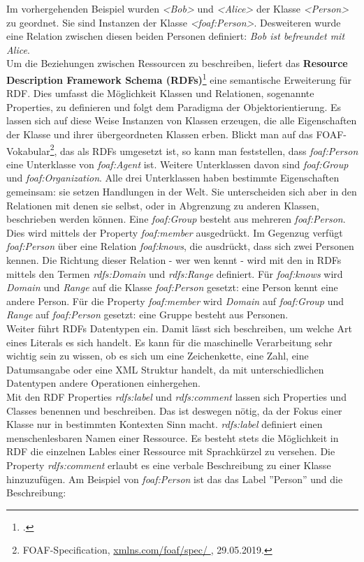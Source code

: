 \documentclass[12pt,a4paper]{article}
\begin{document}
Im vorhergehenden Beispiel wurden \textit{<Bob>} und \textit{<Alice>} der Klasse \textit{<Person>} zu geordnet. Sie sind Instanzen der Klasse \textit{<foaf:Person>}. Desweiteren wurde eine Relation zwischen diesen beiden Personen definiert: \textit{Bob ist befreundet mit Alice}.
\\
Um die Beziehungen zwischen Ressourcen zu beschreiben, liefert das \textbf{Resource Description Framework Schema (RDFs)}\footcite[][]{brickley2014rdf} eine semantische Erweiterung für RDF. Dies umfasst die Möglichkeit Klassen und Relationen, sogenannte Properties, zu definieren und folgt dem Paradigma der Objektorientierung. Es lassen sich auf diese Weise Instanzen von Klassen erzeugen, die alle Eigenschaften der Klasse und ihrer übergeordneten Klassen erben. Blickt man auf das FOAF-Vokabular\footnote{FOAF-Specification, \protect\url{xmlns.com/foaf/spec/ }, 29.05.2019.}, das als RDFs umgesetzt ist, so kann man feststellen, dass \textit{foaf:Person} eine Unterklasse von \textit{foaf:Agent} ist. Weitere Unterklassen davon sind \textit{foaf:Group} und \textit{foaf:Organization}. Alle drei Unterklassen haben bestimmte Eigenschaften gemeinsam: sie setzen Handlungen in der Welt. Sie unterscheiden sich aber in den Relationen mit denen sie selbst, oder in Abgrenzung zu anderen Klassen, beschrieben werden können. Eine \textit{foaf:Group} besteht aus mehreren \textit{foaf:Person}. Dies wird mittels der Property \textit{foaf:member} ausgedrückt. Im Gegenzug verfügt \textit{foaf:Person} über eine Relation \textit{foaf:knows}, die ausdrückt, dass sich zwei Personen kennen. Die Richtung dieser Relation - wer wen kennt - wird mit den in RDFs mittels den Termen \textit{rdfs:Domain} und \textit{rdfs:Range} definiert. 
Für \textit{foaf:knows} wird \textit{Domain} und \textit{Range} auf die Klasse\textit{ foaf:Person} gesetzt: eine Person kennt eine andere Person. Für die Property \textit{foaf:member} wird \textit{Domain} auf \textit{foaf:Group} und \textit{Range} auf \textit{foaf:Person} gesetzt: eine Gruppe besteht aus Personen.
\\
Weiter führt RDFs Datentypen ein. Damit lässt sich beschreiben, um welche Art eines Literals es sich handelt. Es kann für die maschinelle Verarbeitung sehr wichtig sein zu wissen, ob es sich um eine Zeichenkette, eine Zahl, eine Datumsangabe oder eine XML Struktur handelt, da mit unterschiedlichen Datentypen andere Operationen einhergehen. 
\\
Mit den RDF Properties \textit{rdfs:label} und \textit{rdfs:comment} lassen sich Properties und Classes benennen und beschreiben. Das ist deswegen nötig, da der Fokus einer Klasse nur in bestimmten Kontexten Sinn macht. \textit{rdfs:label} definiert einen menschenlesbaren Namen einer Ressource. Es besteht stets die Möglichkeit in RDF die einzelnen Lables einer Ressource mit Sprachkürzel zu versehen. Die Property \textit{rdfs:comment} erlaubt es eine verbale Beschreibung zu einer Klasse hinzuzufügen. Am Beispiel von \textit{foaf:Person} ist das das Label ''Person'' und die Beschreibung:\\
\end{document}
